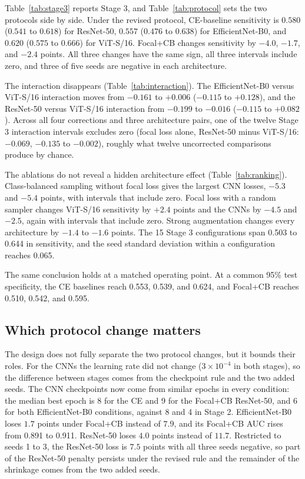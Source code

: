 Table~\ref{tab:stage3} reports Stage 3, and Table~\ref{tab:protocol} sets the two protocols side by side. Under the revised protocol, CE-baseline sensitivity is $0.580$ ($0.541$ to $0.618$) for ResNet-50, $0.557$ ($0.476$ to $0.638$) for EfficientNet-B0, and $0.620$ ($0.575$ to $0.666$) for ViT-S/16. Focal+CB changes sensitivity by $-4.0$, $-1.7$, and $-2.4$ points. All three changes have the same sign, all three intervals include zero, and three of five seeds are negative in each architecture.

The interaction disappears (Table~\ref{tab:interaction}). The EfficientNet-B0 versus ViT-S/16 interaction moves from $-0.161$ to $+0.006$ ($-0.115$ to $+0.128$), and the ResNet-50 versus ViT-S/16 interaction from $-0.199$ to $-0.016$ ($-0.115$ to $+0.082$). Across all four corrections and three architecture pairs, one of the twelve Stage 3 interaction intervals excludes zero (focal loss alone, ResNet-50 minus ViT-S/16: $-0.069$, $-0.135$ to $-0.002$), roughly what twelve uncorrected comparisons produce by chance.

The ablations do not reveal a hidden architecture effect (Table~\ref{tab:ranking}). Class-balanced sampling without focal loss gives the largest CNN losses, $-5.3$ and $-5.4$ points, with intervals that include zero. Focal loss with a random sampler changes ViT-S/16 sensitivity by $+2.4$ points and the CNNs by $-4.5$ and $-2.5$, again with intervals that include zero. Strong augmentation changes every architecture by $-1.4$ to $-1.6$ points. The 15 Stage 3 configurations span 0.503 to 0.644 in sensitivity, and the seed standard deviation within a configuration reaches 0.065.

The same conclusion holds at a matched operating point. At a common 95\% test specificity, the CE baselines reach 0.553, 0.539, and 0.624, and Focal+CB reaches 0.510, 0.542, and 0.595.






\subsection{Which protocol change matters}

The design does not fully separate the two protocol changes, but it bounds their roles. For the CNNs the learning rate did not change ($3\times10^{-4}$ in both stages), so the difference between stages comes from the checkpoint rule and the two added seeds. The CNN checkpoints now come from similar epochs in every condition: the median best epoch is 8 for the CE and 9 for the Focal+CB ResNet-50, and 6 for both EfficientNet-B0 conditions, against 8 and 4 in Stage 2. EfficientNet-B0 loses $1.7$ points under Focal+CB instead of $7.9$, and its Focal+CB AUC rises from 0.891 to 0.911. ResNet-50 loses $4.0$ points instead of $11.7$. Restricted to seeds 1 to 3, the ResNet-50 loss is $7.5$ points with all three seeds negative, so part of the ResNet-50 penalty persists under the revised rule and the remainder of the shrinkage comes from the two added seeds.


